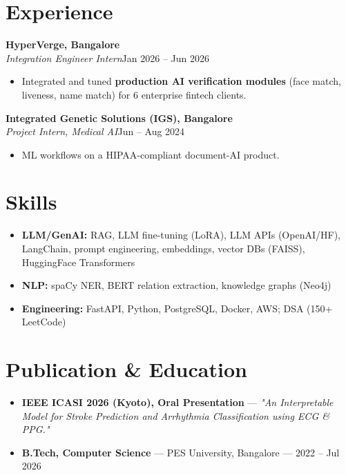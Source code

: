 \documentclass[10pt,a4paper]{article}
\begin{document}
\section*{Experience}
\vspace{1pt}\textbf{HyperVerge, Bangalore}\\
\textit{Integration Engineer Intern}\hfill Jan 2026 -- Jun 2026\par\vspace{1pt}
\begin{itemize}
\item Integrated and tuned \textbf{production AI verification modules} (face match, liveness, name match) for 6 enterprise fintech clients.
\end{itemize}
\vspace{1pt}\textbf{Integrated Genetic Solutions (IGS), Bangalore}\\
\textit{Project Intern, Medical AI}\hfill Jun -- Aug 2024\par\vspace{1pt}
\begin{itemize}
\item ML workflows on a HIPAA-compliant document-AI product.
\end{itemize}
\section*{Skills}
\begin{itemize}
\item \textbf{LLM/GenAI:} RAG, LLM fine-tuning (LoRA), LLM APIs (OpenAI/HF), LangChain, prompt engineering, embeddings, vector DBs (FAISS), HuggingFace Transformers
\item \textbf{NLP:} spaCy NER, BERT relation extraction, knowledge graphs (Neo4j)
\item \textbf{Engineering:} FastAPI, Python, PostgreSQL, Docker, AWS; DSA (150+ LeetCode)
\end{itemize}
\section*{Publication \& Education}
\begin{itemize}
\item \textbf{IEEE ICASI 2026 (Kyoto), Oral Presentation} --- \textit{"An Interpretable Model for Stroke Prediction and Arrhythmia Classification using ECG \& PPG."}
\item \textbf{B.Tech, Computer Science} --- PES University, Bangalore --- 2022 -- Jul 2026
\end{itemize}
\end{document}
